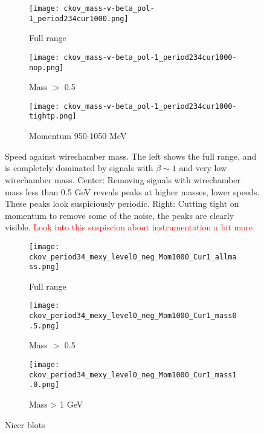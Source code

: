    \begin{figure}[h]	
 \centering   
               \begin{subfigure}[b]{0.3\textwidth}
            \centering
            \texttt{[image: ckov\_mass-v-beta\_pol-1\_period234cur1000.png]}
            \caption{Full range}
            \end{subfigure}
             \hfill   
            \begin{subfigure}[b]{0.3\textwidth}
            \centering
            \texttt{[image: ckov\_mass-v-beta\_pol-1\_period234cur1000-nop.png]}
            \caption{Mass $>$ 0.5}
            \end{subfigure}
             \hfill   
            \begin{subfigure}[b]{0.3\textwidth}
            \centering
            \texttt{[image: ckov\_mass-v-beta\_pol-1\_period234cur1000-tightp.png]}
            \caption{Momentum 950-1050 MeV}
            \end{subfigure}
            
\caption{Speed against wirechamber mass. The left shows the full range, and is completely dominated by signals with $\beta\sim 1$ and very low wirechamber mass. Center: Removing signals with wirechamber mass less than 0.5 GeV reveals peaks at higher masses, lower speeds. These peaks look suspiciously periodic. Right: Cutting tight on momentum to remove some of the noise, the peaks are clearly visible. \textcolor{red}{Look into this suspiscion about instrumentation a bit more} }
\label{fig_beta-mass-ckov}
  \end{figure}
  
  
     \begin{figure}[h]	
 \centering   
               \begin{subfigure}[b]{0.3\textwidth}
            \centering
            \texttt{[image: ckov\_period34\_mexy\_level0\_neg\_Mom1000\_Cur1\_allmass.png]}
            \caption{Full range}
            \end{subfigure}
             \hfill   
            \begin{subfigure}[b]{0.3\textwidth}
            \centering
            \texttt{[image: ckov\_period34\_mexy\_level0\_neg\_Mom1000\_Cur1\_mass0.5.png]}
            \caption{Mass $>$ 0.5}
            \end{subfigure}
             \hfill   
            \begin{subfigure}[b]{0.3\textwidth}
            \centering
            \texttt{[image: ckov\_period34\_mexy\_level0\_neg\_Mom1000\_Cur1\_mass1.0.png]}
            \caption{Mass > 1 GeV}
            \end{subfigure}
            
\caption{Nicer blots }
\label{fig_beta-mass-ckov-nicer}
  \end{figure}
  
